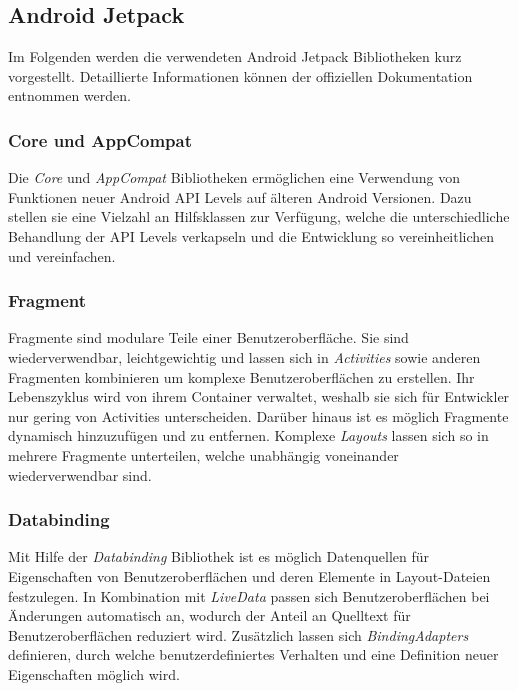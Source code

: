\documentclass[a4paper, 11pt]{article}
\begin{document}
\subsection{Android Jetpack}
\label{subsec:app:jetpack}
Im Folgenden werden die verwendeten Android Jetpack Bibliotheken kurz vorgestellt. Detaillierte Informationen können der offiziellen Dokumentation entnommen werden.

\subsubsection{Core und AppCompat}
\label{subsubsec:app:jetpack:base}
Die \textit{Core} und \textit{AppCompat} Bibliotheken ermöglichen eine Verwendung von Funktionen neuer Android API Levels auf älteren Android Versionen.
Dazu stellen sie eine Vielzahl an Hilfsklassen zur Verfügung, welche die unterschiedliche Behandlung der API Levels verkapseln und die Entwicklung so vereinheitlichen und vereinfachen.

\subsubsection{Fragment}
\label{subsubsec:app:jetpack:fragment}
Fragmente sind modulare Teile einer Benutzeroberfläche.
Sie sind wiederverwendbar, leichtgewichtig und lassen sich in \textit{Activities} sowie anderen Fragmenten kombinieren um komplexe Benutzeroberflächen zu erstellen.
Ihr Lebenszyklus wird von ihrem Container verwaltet, weshalb sie sich für Entwickler nur gering von Activities unterscheiden.
Darüber hinaus ist es möglich Fragmente dynamisch hinzuzufügen und zu entfernen.
Komplexe \textit{Layouts} lassen sich so in mehrere Fragmente unterteilen, welche unabhängig voneinander wiederverwendbar sind.

\subsubsection{Databinding}
\label{subsubsec:app:jetpack:databinding}
Mit Hilfe der \textit{Databinding} Bibliothek ist es möglich Datenquellen für Eigenschaften von Benutzeroberflächen und deren Elemente in Layout-Dateien festzulegen.
In Kombination mit \textit{LiveData} passen sich Benutzeroberflächen bei Änderungen automatisch an, wodurch der Anteil an Quelltext für Benutzeroberflächen reduziert wird.
Zusätzlich lassen sich \textit{BindingAdapters} definieren, durch welche benutzerdefiniertes Verhalten und eine Definition neuer Eigenschaften möglich wird.
\end{document}
